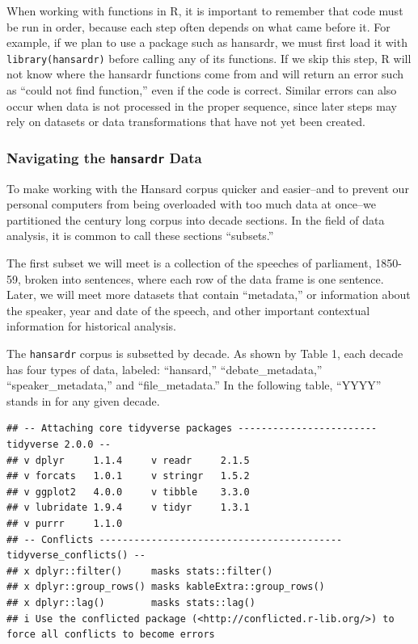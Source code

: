 \documentclass[
]{article}
\begin{document}
When working with functions in R, it is important to remember that code
must be run in order, because each step often depends on what came
before it. For example, if we plan to use a package such as hansardr, we
must first load it with \texttt{library(hansardr)} before calling any of
its functions. If we skip this step, R will not know where the hansardr
functions come from and will return an error such as ``could not find
function,'' even if the code is correct. Similar errors can also occur
when data is not processed in the proper sequence, since later steps may
rely on datasets or data transformations that have not yet been created.

\subsubsection{\texorpdfstring{Navigating the \texttt{hansardr}
Data}{Navigating the hansardr Data}}\label{navigating-the-hansardr-data}

To make working with the Hansard corpus quicker and easier--and to
prevent our personal computers from being overloaded with too much data
at once--we partitioned the century long corpus into decade sections. In
the field of data analysis, it is common to call these sections
``subsets.''

The first subset we will meet is a collection of the speeches of
parliament, 1850-59, broken into sentences, where each row of the data
frame is one sentence. Later, we will meet more datasets that contain
``metadata,'' or information about the speaker, year and date of the
speech, and other important contextual information for historical
analysis.

The \texttt{hansardr} corpus is subsetted by decade. As shown by Table
1, each decade has four types of data, labeled: ``hansard,''
``debate\_metadata,'' ``speaker\_metadata,'' and ``file\_metadata.'' In
the following table, ``YYYY'' stands in for any given decade.

\begin{verbatim}
## -- Attaching core tidyverse packages ------------------------ tidyverse 2.0.0 --
## v dplyr     1.1.4     v readr     2.1.5
## v forcats   1.0.1     v stringr   1.5.2
## v ggplot2   4.0.0     v tibble    3.3.0
## v lubridate 1.9.4     v tidyr     1.3.1
## v purrr     1.1.0     
## -- Conflicts ------------------------------------------ tidyverse_conflicts() --
## x dplyr::filter()     masks stats::filter()
## x dplyr::group_rows() masks kableExtra::group_rows()
## x dplyr::lag()        masks stats::lag()
## i Use the conflicted package (<http://conflicted.r-lib.org/>) to force all conflicts to become errors
\end{verbatim}
\end{document}
